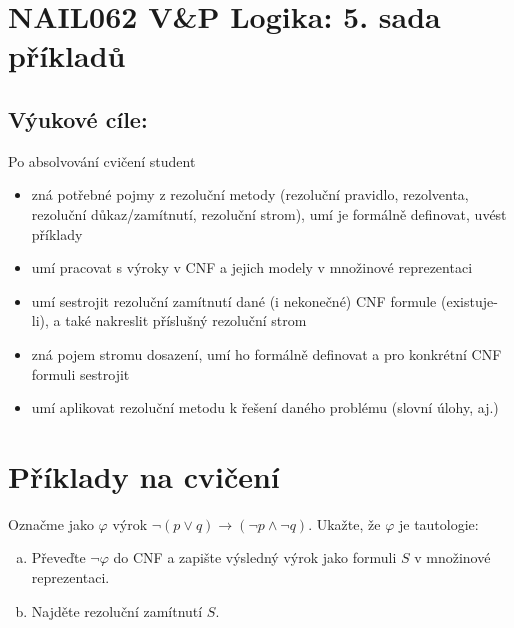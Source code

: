 \section*{NAIL062 V\&P Logika: 5. sada příkladů}


\subsection*{Výukové cíle:} Po absolvování cvičení student

    \begin{itemize}\setlength{\itemsep}{0pt}
        \item zná potřebné pojmy z rezoluční metody (rezoluční pravidlo, rezolventa, rezoluční důkaz/zamítnutí, rezoluční strom), umí je formálně definovat, uvést příklady
        \item umí pracovat s výroky v CNF a jejich modely v množinové reprezentaci
        \item umí sestrojit rezoluční zamítnutí dané (i nekonečné) CNF formule (existuje-li), a také nakreslit příslušný rezoluční strom
        \item zná pojem stromu dosazení, umí ho formálně definovat a pro konkrétní CNF formuli sestrojit
        \item umí aplikovat rezoluční metodu k řešení daného problému (slovní úlohy, aj.)
    \end{itemize}
    

\section*{Příklady na cvičení}


\begin{problem}

    Označme jako $\varphi$ výrok $\neg (p \vee q) \to (\neg p \wedge \neg q)$. Ukažte, že $\varphi$ je tautologie:
    \begin{enumerate}[(a)]
        \item Převeďte $\neg \varphi$ do CNF a zapište výsledný výrok jako formuli $S$ v množinové reprezentaci.
        \item Najděte rezoluční zamítnutí $S$.
    \end{enumerate}

    \begin{solution}
                    
    \end{solution}

\end{problem}



